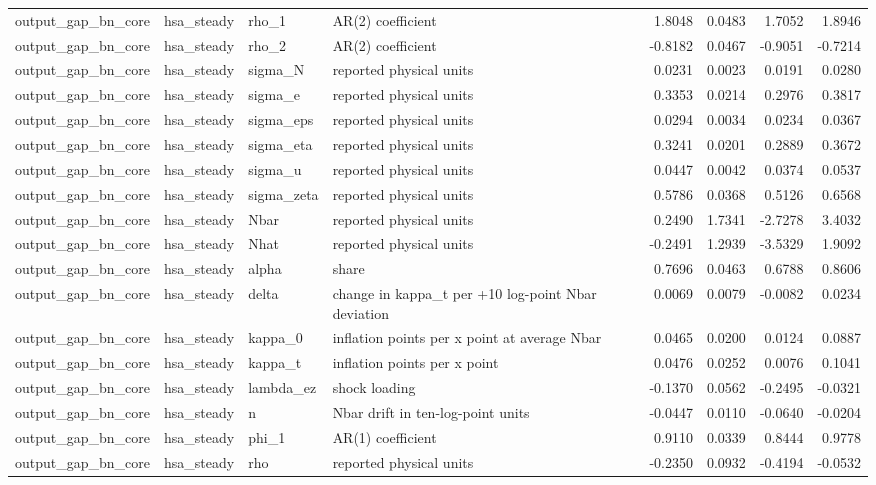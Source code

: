 \begin{tabular}{llllrrrr}
output\_gap\_bn\_core & hsa\_steady & rho\_1 & AR(2) coefficient & 1.8048 & 0.0483 & 1.7052 & 1.8946 \\
output\_gap\_bn\_core & hsa\_steady & rho\_2 & AR(2) coefficient & -0.8182 & 0.0467 & -0.9051 & -0.7214 \\
output\_gap\_bn\_core & hsa\_steady & sigma\_N & reported physical units & 0.0231 & 0.0023 & 0.0191 & 0.0280 \\
output\_gap\_bn\_core & hsa\_steady & sigma\_e & reported physical units & 0.3353 & 0.0214 & 0.2976 & 0.3817 \\
output\_gap\_bn\_core & hsa\_steady & sigma\_eps & reported physical units & 0.0294 & 0.0034 & 0.0234 & 0.0367 \\
output\_gap\_bn\_core & hsa\_steady & sigma\_eta & reported physical units & 0.3241 & 0.0201 & 0.2889 & 0.3672 \\
output\_gap\_bn\_core & hsa\_steady & sigma\_u & reported physical units & 0.0447 & 0.0042 & 0.0374 & 0.0537 \\
output\_gap\_bn\_core & hsa\_steady & sigma\_zeta & reported physical units & 0.5786 & 0.0368 & 0.5126 & 0.6568 \\
output\_gap\_bn\_core & hsa\_steady & Nbar & reported physical units & 0.2490 & 1.7341 & -2.7278 & 3.4032 \\
output\_gap\_bn\_core & hsa\_steady & Nhat & reported physical units & -0.2491 & 1.2939 & -3.5329 & 1.9092 \\
output\_gap\_bn\_core & hsa\_steady & alpha & share & 0.7696 & 0.0463 & 0.6788 & 0.8606 \\
output\_gap\_bn\_core & hsa\_steady & delta & change in kappa\_t per +10 log-point Nbar deviation & 0.0069 & 0.0079 & -0.0082 & 0.0234 \\
output\_gap\_bn\_core & hsa\_steady & kappa\_0 & inflation points per x point at average Nbar & 0.0465 & 0.0200 & 0.0124 & 0.0887 \\
output\_gap\_bn\_core & hsa\_steady & kappa\_t & inflation points per x point & 0.0476 & 0.0252 & 0.0076 & 0.1041 \\
output\_gap\_bn\_core & hsa\_steady & lambda\_ez & shock loading & -0.1370 & 0.0562 & -0.2495 & -0.0321 \\
output\_gap\_bn\_core & hsa\_steady & n & Nbar drift in ten-log-point units & -0.0447 & 0.0110 & -0.0640 & -0.0204 \\
output\_gap\_bn\_core & hsa\_steady & phi\_1 & AR(1) coefficient & 0.9110 & 0.0339 & 0.8444 & 0.9778 \\
output\_gap\_bn\_core & hsa\_steady & rho & reported physical units & -0.2350 & 0.0932 & -0.4194 & -0.0532 \\

\end{tabular}
